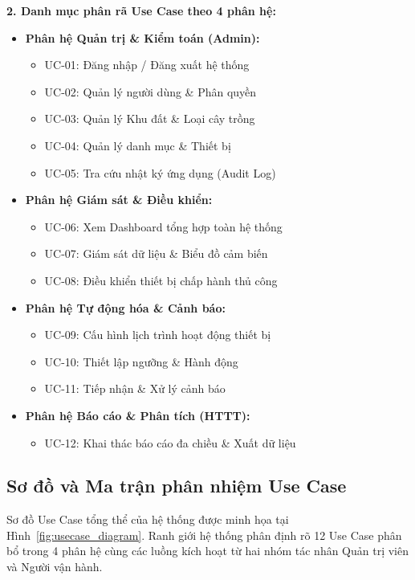 \vspace{0.3cm}
\noindent\textbf{2. Danh mục phân rã Use Case theo 4 phân hệ:}
\begin{itemize}
    \item \textbf{Phân hệ Quản trị \& Kiểm toán (Admin):}
    \begin{itemize}
        \item UC-01: Đăng nhập / Đăng xuất hệ thống
        \item UC-02: Quản lý người dùng \& Phân quyền
        \item UC-03: Quản lý Khu đất \& Loại cây trồng
        \item UC-04: Quản lý danh mục \& Thiết bị
        \item UC-05: Tra cứu nhật ký ứng dụng (Audit Log)
    \end{itemize}
    \item \textbf{Phân hệ Giám sát \& Điều khiển:}
    \begin{itemize}
        \item UC-06: Xem Dashboard tổng hợp toàn hệ thống
        \item UC-07: Giám sát dữ liệu \& Biểu đồ cảm biến
        \item UC-08: Điều khiển thiết bị chấp hành thủ công
    \end{itemize}
    \item \textbf{Phân hệ Tự động hóa \& Cảnh báo:}
    \begin{itemize}
        \item UC-09: Cấu hình lịch trình hoạt động thiết bị
        \item UC-10: Thiết lập ngưỡng \& Hành động
        \item UC-11: Tiếp nhận \& Xử lý cảnh báo
    \end{itemize}
    \item \textbf{Phân hệ Báo cáo \& Phân tích (HTTT):}
    \begin{itemize}
        \item UC-12: Khai thác báo cáo đa chiều \& Xuất dữ liệu
    \end{itemize}
\end{itemize}

\subsection{Sơ đồ và Ma trận phân nhiệm Use Case}

Sơ đồ Use Case tổng thể của hệ thống được minh họa tại Hình~\ref{fig:usecase_diagram}. Ranh giới hệ thống phân định rõ 12 Use Case phân bổ trong 4 phân hệ cùng các luồng kích hoạt từ hai nhóm tác nhân Quản trị viên và Người vận hành.

